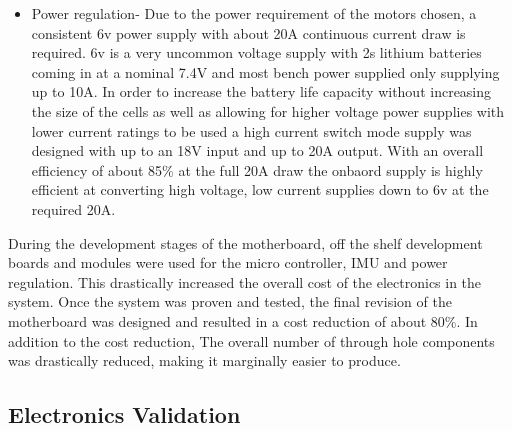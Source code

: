 \documentclass[conference]{IEEEtran}
\newcommand*{\ClipSep}{0.2cm}%
\begin{document}
\begin{itemize}
        \item Power regulation-
        Due to the power requirement of the motors chosen, a consistent 6v power supply with about 20A continuous current draw is required. 6v is a very uncommon voltage supply with 2s lithium batteries coming in at a nominal 7.4V and most bench power supplied only supplying up to 10A. In order to increase the battery life capacity without increasing the size of the cells as well as allowing for higher voltage power supplies with lower current ratings to be used a high current switch mode supply was designed with up to an 18V input and up to 20A output. With an overall efficiency of about 85\% at the full 20A draw the onbaord supply is highly efficient at converting high voltage, low current supplies down to 6v at the required 20A. \newline
    \end{itemize}
    During the development stages of the motherboard, off the shelf development boards and modules were used for the micro controller, IMU and power regulation. This drastically increased the overall cost of the electronics in the system. Once the system was proven and tested, the final revision of the motherboard was designed and resulted in a cost reduction of about 80\%. In addition to the cost reduction, The overall number of through hole components was drastically reduced, making it marginally easier to produce.
    
    
    
\subsection{Electronics Validation}
\end{document}
